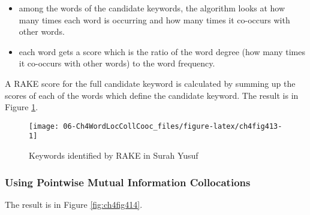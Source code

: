 \documentclass[
]{article}
\newenvironment{Shaded}{\begin{snugshade}}{\end{snugshade}}
\newcommand{\AttributeTok}[1]{\textcolor[rgb]{0.13,0.29,0.53}{#1}}
\newcommand{\FunctionTok}[1]{\textcolor[rgb]{0.13,0.29,0.53}{\textbf{#1}}}
\newcommand{\NormalTok}[1]{#1}
\newcommand{\OtherTok}[1]{\textcolor[rgb]{0.56,0.35,0.01}{#1}}
\newcommand{\SpecialCharTok}[1]{\textcolor[rgb]{0.81,0.36,0.00}{\textbf{#1}}}
\newcommand{\StringTok}[1]{\textcolor[rgb]{0.31,0.60,0.02}{#1}}
\providecommand{\tightlist}{%
  \setlength{\itemsep}{0pt}\setlength{\parskip}{0pt}}
\begin{document}
\begin{itemize}
\tightlist
\item
  among the words of the candidate keywords, the algorithm looks at how many times each word is occurring and how many times it co-occurs with other words.
\item
  each word gets a score which is the ratio of the word degree (how many times it co-occurs with other words) to the word frequency.
\end{itemize}

A RAKE score for the full candidate keyword is calculated by summing up the scores of each of the words which define the candidate keyword. The result is in Figure \ref{fig:ch4fig413}.

\begin{Shaded}
\end{Shaded}

\begin{figure}

{\centering \texttt{[image: 06-Ch4WordLocCollCooc\_files/figure-latex/ch4fig413-1]} 

}

\caption{Keywords identified by RAKE in Surah Yusuf}\label{fig:ch4fig413}
\end{figure}

\hypertarget{using-pointwise-mutual-information-collocations}{%
\subsubsection{Using Pointwise Mutual Information Collocations}\label{using-pointwise-mutual-information-collocations}}

The result is in Figure \ref{fig:ch4fig414}.

\scriptsize
\end{document}
